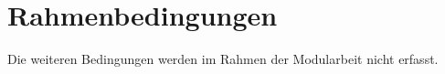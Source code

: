 \section{Rahmenbedingungen}
\label{sec:rahmenbedingungen}

Die weiteren Bedingungen werden im Rahmen der Modularbeit nicht erfasst.
